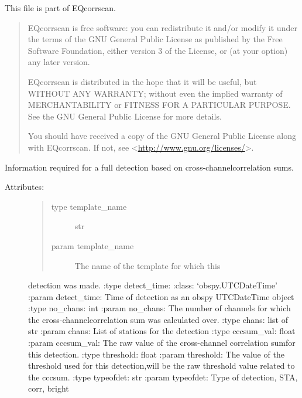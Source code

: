 \documentclass[a4paper,10pt,english]{sphinxmanual}
\begin{document}
This file is part of EQcorrscan.
\begin{quote}

EQcorrscan is free software: you can redistribute it and/or modify
it under the terms of the GNU General Public License as published by
the Free Software Foundation, either version 3 of the License, or
(at your option) any later version.

EQcorrscan is distributed in the hope that it will be useful,
but WITHOUT ANY WARRANTY; without even the implied warranty of
MERCHANTABILITY or FITNESS FOR A PARTICULAR PURPOSE.  See the
GNU General Public License for more details.

You should have received a copy of the GNU General Public License
along with EQcorrscan.  If not, see \textless{}\href{http://www.gnu.org/licenses/}{http://www.gnu.org/licenses/}\textgreater{}.
\end{quote}

\begin{fulllineitems}
\label{submodules/core.match_filter:match_filter.DETECTION}
Information required for a full detection based on cross-channelcorrelation sums.
\begin{description}
\item[{Attributes:}] \leavevmode\begin{quote}\begin{description}
\item[{type template\_name}] \leavevmode
str

\item[{param template\_name}] \leavevmode
The name of the template for which this

\end{description}\end{quote}

detection was made.
:type detect\_time: :class: `obspy.UTCDateTime'
:param detect\_time: Time of detection as an obspy UTCDateTime object
:type no\_chans: int
:param no\_chans: The number of channels for which the cross-channelcorrelation sum was calculated over.
:type chans: list of str
:param chans: List of stations for the detection
:type cccsum\_val: float
:param cccsum\_val: The raw value of the cross-channel correlation sumfor this detection.
:type threshold: float
:param threshold: The value of the threshold used for this detection,will be the raw threshold value related to the cccsum.
:type typeofdet: str
:param typeofdet: Type of detection, STA, corr, bright

\end{description}

\end{fulllineitems}
\end{document}
